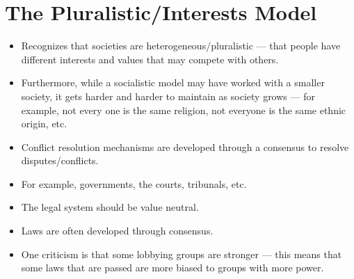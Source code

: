 \documentclass{article}
\begin{document}
\section{The Pluralistic/Interests Model}
\begin{itemize}
    \item Recognizes that societies are heterogeneous/pluralistic --- that people have different interests and values that may compete with others.
    \item Furthermore, while a socialistic model may have worked with a smaller society, it gets harder and harder to maintain as society grows --- for example, not every one is the same religion, not everyone is the same ethnic origin, etc.
    \item Conflict resolution mechanisms are developed through a consensus to resolve disputes/conflicts.
    \item For example, governments, the courts, tribunals, etc.
    \item The legal system should be value neutral.
    \item Laws are often developed through consensus.
    \item One criticism is that some lobbying groups are stronger --- this means that some laws that are passed are more biased to groups with more power.
\end{itemize}
\end{document}

